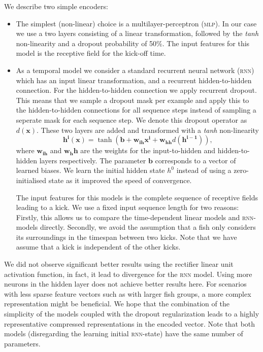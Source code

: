 \documentclass[nobib, a4paper]{tufte-handout}
\begin{document}
We describe two simple encoders:
\begin{itemize}
\item The simplest (non-linear) choice is a multilayer-perceptron (\textsc{mlp}).
  In our case we use a two layers consisting of a linear transformation, followed by the \textit{tanh} non-linearity and a dropout probability of 50\%\autocite{dropout}.
  The input features for this model is the receptive field for the kick-off time.
\item
  As a temporal model we consider a standard recurrent neural network (\textsc{rnn}) which has an input linear transformation, and a recurrent hidden-to-hidden connection.
  For the hidden-to-hidden connection we apply recurrent dropout\autocite{recurrentDropout}.
  This means that we sample a dropout mask per example and apply this to the hidden-to-hidden connections for all sequence steps instead of sampling a seperate mask for each sequence step.
  We denote this dropout operator as \(d(\bm{x})\).
  These two layers are added and transformed with a \textit{tanh} non-linearity
  \begin{equation*}
    \bm{h^i} (\bm{x}) = \operatorname{tanh} \left( \bm{b} + \bm{w_{ih}} \bm{x^i} + \bm{w_{hh}} d (\bm{h^{i-1}}) \right),
  \end{equation*}
  where \(\bm{w_{ih}}\) and \(\bm{w_hh}\) are the weights for the input-to-hidden and hidden-to-hidden layers respectively.
  The parameter \(\bm{b}\) corresponds to a vector of learned biases.
  We learn the initial hidden state \(h^0\) instead of using a zero-initialised state as it improved the speed of convergence.

  The input features for this models is the complete sequence of receptive fields leading to a kick.
  We use a fixed input sequence length for two reasons:
  Firstly, this allows us to compare the time-dependent linear models and \textsc{rnn}-models directly.
  Secondly, we avoid the assumption that a fish only considers its surroundings in the timespan between two kicks.
  Note that we have assume that a kick is independent of the other kicks.
\end{itemize}
We did not observe significant better results using the rectifier linear unit activation function, in fact, it lead to divergence for the \textsc{rnn} model.
Using more neurons in the hidden layer does not achieve better results here.
For scenarios with less sparse feature vectors such as with larger fish groups, a more complex representation might be beneficial.
We hope that the combination of the simplicity of the models coupled with the dropout regularization leads to a highly representative compressed representations in the encoded vector.
Note that both models (disregarding the learning initial \textsc{rnn}-state) have the same number of parameters.
\end{document}
